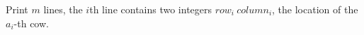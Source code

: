 Print $m$ lines, the $i$th line contains two integers $row_i\ column_i$, the location of the $a_i$-th cow.
